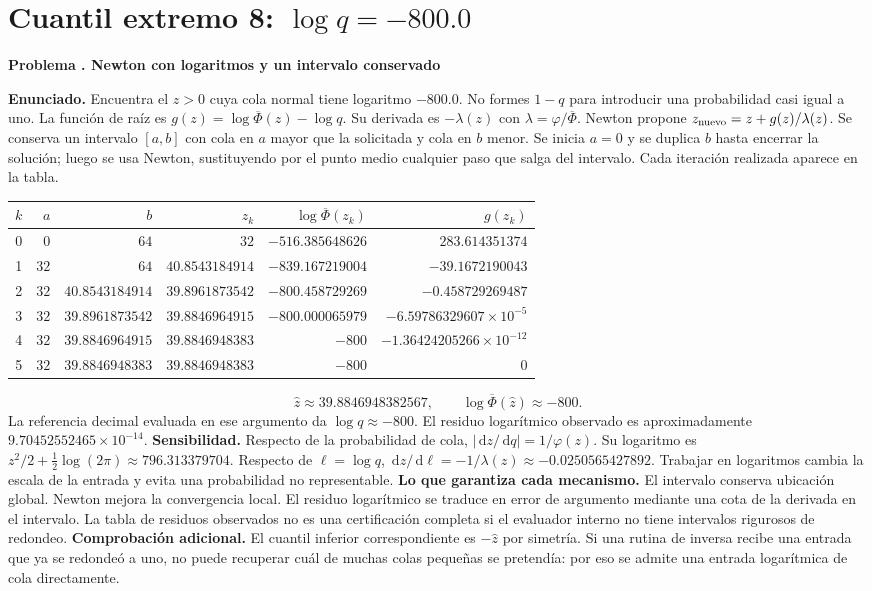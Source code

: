 \documentclass[11pt,a4paper]{article}
\newcommand{\dd}{\,\mathrm d}
\theoremstyle{definition}
\newcounter{problema}
\newenvironment{resuelto}[1]{\refstepcounter{problema}\par\medskip\Needspace{6\baselineskip}\textbf{Problema \theproblema. #1}\par}{\par\medskip}
\newcommand{\SF}{\overline\Phi}
\begin{document}
\section{\texorpdfstring{Cuantil extremo 8: $\log q=-800.0$}{Cuantil extremo 8: log q=-800.0}}
\begin{resuelto}{Newton con logaritmos y un intervalo conservado}
\textbf{Enunciado.} Encuentra el $z>0$ cuya cola normal tiene logaritmo $-800.0$. No formes $1-q$ para introducir una probabilidad casi igual a uno.
La función de raíz es $g(z)=\log\SF(z)-\log q$. Su derivada es $-\lambda(z)$ con $\lambda=\varphi/\SF$. Newton propone $z_{\rm nuevo}=z+g(z)/\lambda(z)$. Se conserva un intervalo $[a,b]$ con cola en $a$ mayor que la solicitada y cola en $b$ menor.
Se inicia $a=0$ y se duplica $b$ hasta encerrar la solución; luego se usa Newton, sustituyendo por el punto medio cualquier paso que salga del intervalo. Cada iteración realizada aparece en la tabla.

\begin{center}\small\begin{tabular}{rrrrrr}
\toprule
$k$&$a$&$b$&$z_k$&$\log\SF(z_k)$&$g(z_k)$\\
\midrule
0&$0$&$64$&$32$&$-516.385648626$&$283.614351374$\\
1&$32$&$64$&$40.8543184914$&$-839.167219004$&$-39.1672190043$\\
2&$32$&$40.8543184914$&$39.8961873542$&$-800.458729269$&$-0.458729269487$\\
3&$32$&$39.8961873542$&$39.8846964915$&$-800.000065979$&$-6.59786329607\times10^{-5}$\\
4&$32$&$39.8846964915$&$39.8846948383$&$-800$&$-1.36424205266\times10^{-12}$\\
5&$32$&$39.8846948383$&$39.8846948383$&$-800$&$0$\\
\bottomrule\end{tabular}\end{center}
\[
\widehat z\approx39.8846948382567,\qquad \log\SF(\widehat z)\approx-800.
\]
La referencia decimal evaluada en ese argumento da $\log q\approx-800$. El residuo logarítmico observado es aproximadamente $9.70452552465\times10^{-14}$.
\textbf{Sensibilidad.} Respecto de la probabilidad de cola, $|\dd z/\dd q|=1/\varphi(z)$. Su logaritmo es $z^2/2+\tfrac12\log(2\pi)\approx796.313379704$. Respecto de $\ell=\log q$, $\dd z/\dd\ell=-1/\lambda(z)\approx-0.0250565427892$. Trabajar en logaritmos cambia la escala de la entrada y evita una probabilidad no representable.
\textbf{Lo que garantiza cada mecanismo.} El intervalo conserva ubicación global. Newton mejora la convergencia local. El residuo logarítmico se traduce en error de argumento mediante una cota de la derivada en el intervalo. La tabla de residuos observados no es una certificación completa si el evaluador interno no tiene intervalos rigurosos de redondeo.
\textbf{Comprobación adicional.} El cuantil inferior correspondiente es $-\widehat z$ por simetría. Si una rutina de inversa recibe una entrada que ya se redondeó a uno, no puede recuperar cuál de muchas colas pequeñas se pretendía: por eso se admite una entrada logarítmica de cola directamente.
\end{resuelto}
\end{document}
